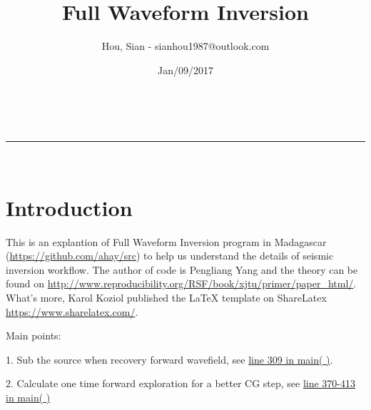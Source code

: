 \documentclass[a4paper,11pt]{article}
\makeatletter
\newcommand{\linia}{\rule{\linewidth}{0.5pt}}
\theoremstyle{mytheor}
\renewcommand{\maketitle}{
\begin{center}
\vspace{2ex}
{\huge \textsc{\@title}}
\vspace{1ex}
\\
\linia\\
\@author \hfill \@date
\vspace{4ex}
\end{center}
}
\makeatother
\begin{document}
\title{Full Waveform Inversion}

\author{Hou, Sian - sianhou1987@outlook.com}

\date{Jan/09/2017}

\maketitle

\section*{Introduction}
This is an explantion of Full Waveform Inversion program in Madagascar (\url{https://github.com/ahay/src}) to help us understand the details of seismic inversion workflow. The author of code is Pengliang Yang and the theory can be found on \url{ http://www.reproducibility.org/RSF/book/xjtu/primer/paper_html/}. What's more, Karol Koziol published the {\LaTeX} template on ShareLatex \url{https://www.sharelatex.com/}.

Main points: 

1. Sub the source when recovery forward wavefield, see \hyperref[mainpoint_1]{line 309 in main( )}.

2. Calculate one time forward exploration for a better CG step, see \hyperref[mainpoint_2]{line 370-413 in main( )}
\end{document}
